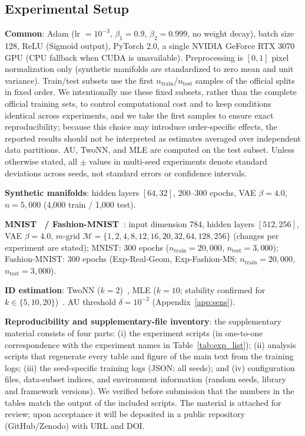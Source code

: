 \documentclass[make,article,submit,pdftex,moreauthors]{Definitions/mdpi}
\begin{document}
\subsection{Experimental Setup}\label{sec:exp_setup}

\textbf{Common}: Adam (lr $= 10^{-3}$, $\beta_1 = 0.9$, $\beta_2 = 0.999$,
no weight decay), batch size 128, ReLU (Sigmoid output), PyTorch 2.0, a
single NVIDIA GeForce RTX 3070 GPU (CPU fallback when CUDA is unavailable).
Preprocessing is $[0,1]$ pixel normalization only (synthetic manifolds are
standardized to zero mean and unit variance).
Train/test subsets use the first $n_{\mathrm{train}}$/$n_{\mathrm{test}}$
samples of the official splits in fixed order.
We intentionally use these fixed subsets, rather than the complete official
training sets, to control computational cost and to keep conditions
identical across experiments, and we take the first samples to ensure exact
reproducibility; because this choice may introduce order-specific effects,
the reported results should not be interpreted as estimates averaged over
independent data partitions.
AU, TwoNN, and MLE are computed on the test subset.
Unless otherwise stated, all $\pm$ values in multi-seed experiments denote
standard deviations across seeds, not standard errors or confidence
intervals.

\textbf{Synthetic manifolds}: hidden layers $[64, 32]$, 200--300 epochs,
VAE $\beta = 4.0$, $n = 5{,}000$ (4{,}000 train / 1{,}000 test).

\textbf{MNIST~\cite{lecun1998} / Fashion-MNIST~\cite{xiao2017fashion}}:
input dimension 784, hidden layers
$[512, 256]$, VAE $\beta = 4.0$, $m$-grid
$\mathcal{M} = \{1, 2, 4, 8, 12, 16, 20, 32, 64, 128, 256\}$ (changes per
experiment are stated); MNIST: 300 epochs
($n_{\mathrm{train}} = 20{,}000$, $n_{\mathrm{test}} = 3{,}000$);
Fashion-MNIST: 300 epochs (Exp-Real-Geom, Exp-Fashion-MS;
$n_{\mathrm{train}} = 20{,}000$, $n_{\mathrm{test}} = 3{,}000$).

\textbf{ID estimation}: TwoNN ($k = 2$)~\cite{facco2017twonn}, MLE
($k = 10$; stability confirmed for $k \in \{5, 10, 20\}$)~\cite{levina2005mle}.
AU threshold $\delta = 10^{-2}$ (Appendix~\ref{app:sens}).

\textbf{Reproducibility and supplementary-file inventory}:
the supplementary material consists of four parts:
(i) the experiment scripts (in one-to-one correspondence with the experiment
names in Table~\ref{tab:exp_list});
(ii) analysis scripts that regenerate every table and figure of the main
text from the training logs;
(iii) the seed-specific training logs (JSON; all seeds); and
(iv) configuration files, data-subset indices, and environment information
(random seeds, library and framework versions).
We verified before submission that the numbers in the tables match the
output of the included scripts.
The material is attached for review; upon acceptance it will be deposited in
a public repository (GitHub/Zenodo) with URL and DOI.
\end{document}
